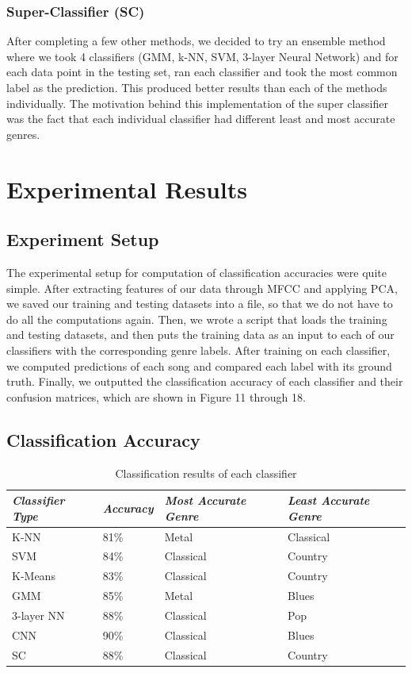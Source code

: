 \subsubsection{\textbf{Super-Classifier (SC)}}
After completing a few other methods, we decided to try an ensemble method where we took 4 classifiers (GMM, k-NN, SVM, 3-layer Neural Network) and for each data point in the testing set, ran each classifier and took the most common label as the prediction. This produced better results than each of the methods individually. The motivation behind this implementation of the super classifier was the fact that each individual classifier had different least and most accurate genres. 

\section{Experimental Results}\label{sec:results}
\subsection{Experiment Setup}
The experimental setup for computation of classification accuracies were quite simple. After extracting features of our data through MFCC and applying PCA, we saved our training and testing datasets into a file, so that we do not have to do all the computations again. Then, we wrote a script that loads the training and testing datasets, and then puts the training data as an input to each of our classifiers with the corresponding genre labels. After training on each classifier, we computed predictions of each song and compared each label with its ground truth. Finally, we outputted the classification accuracy of each classifier and their confusion matrices, which are shown in Figure 11 through 18.

\subsection{Classification Accuracy}

\begin{table}
\begin{center}
\caption{Classification results of each classifier} 
\begin{tabular}{ p{1.9cm} p{1.1cm} p{2.8cm} p{2.8cm}}
 \emph{Classifier Type} & \emph{Accuracy}  & \emph{Most Accurate Genre} & \emph{Least Accurate Genre}\\
 \hline
 K-NN & 81\% & Metal & Classical \\
 SVM & 84\% & Classical & Country \\
 K-Means & 83\% & Classical & Country \\
 GMM & 85\% & Metal & Blues \\
 3-layer NN & 88\% & Classical & Pop \\
 CNN & 90\% & Classical & Blues \\
 SC & 88\% & Classical  & Country  \\
\end{tabular}
\end{center}
\end{table}

